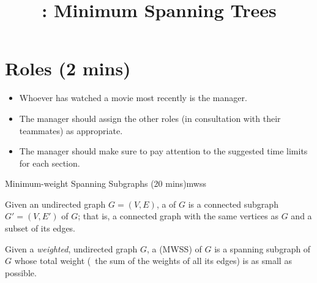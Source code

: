 \documentclass{tufte-handout}
\title{\thecourse: Minimum Spanning Trees}
\date{}
\begin{document}
\maketitle

\section{Roles (2 mins)}

\begin{itemize}
\item Whoever has watched a movie most recently is the manager.
\item The manager should assign the other roles (in consultation with
  their teammates) as appropriate.
\item The manager should make sure to pay attention to the suggested
  time limits for each section.
\end{itemize}

\begin{model*}{Minimum-weight Spanning Subgraphs (20 mins)}{mwss}
  \begin{defn}
    Given an undirected graph $G = (V,E)$, a  of $G$ is a connected subgraph $G' = (V,E')$ of $G$;
    that is, a connected graph with the same vertices as $G$ and a
    subset of its edges.
  \end{defn}

  \begin{defn}
    Given a \emph{weighted}, undirected graph $G$, a
     (MWSS) of $G$ is a
    spanning subgraph of $G$ whose total weight (\ie\ the sum of the
    weights of all its edges) is as small as possible.
  \end{defn}

  \begin{center}
    
  \end{center}
\end{model*}
\end{document}

